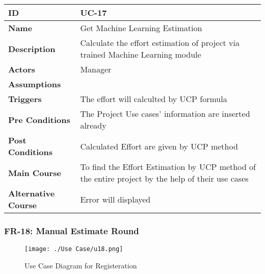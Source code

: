     \begin{center}
        \begin{tabularx}{\textwidth}{|l|X|}
            \hline
            \textbf{ID} & UC-17 \\
            \hline
            \textbf{Name} & Get Machine Learning Estimation \\
            \hline
            \textbf{Description} & Calculate the effort estimation of project via trained Machine Learning module \\
            \hline
            \textbf{Actors} & Manager  \\
            \hline
            \textbf{Assumptions} &  \\
            \hline
            \textbf{Triggers} & The effort will calculted by UCP formula \\
            \hline
            \textbf{Pre Conditions} & The Project Use cases' information are inserted already \\
            \hline
            \textbf{Post Conditions} & Calculated Effort are given by UCP method  \\
            \hline
            \textbf{Main Course} & To find the Effort Estimation by UCP method of the entire project by the help of their use cases \\
            \hline
            \textbf{Alternative Course} & Error will displayed \\
            \hline
            
        \end{tabularx}
    \end{center}
    \newpage
    

    \subsubsection{FR-18: Manual Estimate Round}
    \begin{figure}[H]
        \texttt{[image: ./Use Case/u18.png]}
        \centering 
        \caption{Use Case Diagram for Registeration}
        \label{fig:prototype1}
        \end{figure}
        

